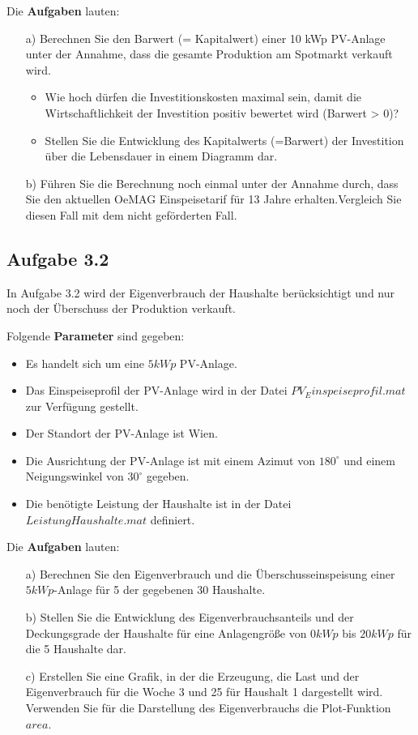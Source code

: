 \documentclass[a4paper,12pt]{article}
\begin{document}
	Die \textbf{Aufgaben} lauten:
	\begin{itemize}
		\item[a)] Berechnen Sie den Barwert (= Kapitalwert) einer 10 kWp PV-Anlage unter der Annahme, dass die gesamte Produktion am Spotmarkt verkauft wird.
		\begin{itemize}
			\item Wie hoch dürfen die Investitionskosten maximal sein, damit die Wirtschaftlichkeit der Investition positiv bewertet wird (Barwert > 0)?
			\item Stellen Sie die Entwicklung des Kapitalwerts (=Barwert) der Investition über die Lebensdauer in einem Diagramm dar.
		\end{itemize}
		\item[b)] Führen Sie die Berechnung noch einmal unter der Annahme durch, dass Sie den aktuellen OeMAG Einspeisetarif für 13 Jahre erhalten.\newline Vergleich Sie diesen Fall mit dem nicht geförderten Fall.
	\end{itemize}
	\subsection{Aufgabe 3.2}
	\label{sec:Aufgabenstellung32}
	In Aufgabe 3.2 wird der Eigenverbrauch der Haushalte berücksichtigt und nur noch der Überschuss der Produktion verkauft.\\ \par
	\noindent Folgende \textbf{Parameter} sind gegeben:
	\begin{itemize}
		\item Es handelt sich um eine $5kWp$ PV-Anlage.
		\item Das Einspeiseprofil der PV-Anlage wird in der Datei $PV_Einspeiseprofil.mat$ zur Verfügung gestellt.
		\item Der Standort der PV-Anlage ist Wien.
		\item Die Ausrichtung der PV-Anlage ist mit einem Azimut von $180^{\circ}$ und einem Neigungswinkel von $30^{\circ}$ gegeben.
		\item Die benötigte Leistung der Haushalte ist in der Datei $LeistungHaushalte.mat$ definiert.
	\end{itemize}
	Die \textbf{Aufgaben} lauten:
	\begin{itemize}
		\item[a)] Berechnen Sie den Eigenverbrauch und die Überschusseinspeisung einer $5kWp$-Anlage für 5 der gegebenen 30 Haushalte.
		\item[b)] Stellen Sie die Entwicklung des Eigenverbrauchsanteils und der Deckungsgrade der Haushalte für eine Anlagengröße von $0kWp$ bis $20kWp$ für die 5 Haushalte dar.
		\item[c)] Erstellen Sie eine Grafik, in der die Erzeugung, die Last und der Eigenverbrauch für die Woche 3 und 25 für Haushalt 1 dargestellt wird. Verwenden Sie für die Darstellung des Eigenverbrauchs die Plot-Funktion $area$.
	\end{itemize}
\end{document}

